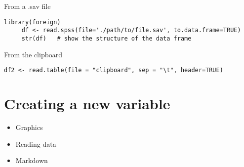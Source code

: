 \documentclass[11pt]{article}
\begin{document}
From a .sav file
\begin{verbatim}
library(foreign)
     df <- read.spss(file='./path/to/file.sav', to.data.frame=TRUE) 
     str(df)   # show the structure of the data frame
\end{verbatim}


From the clipboard
\begin{verbatim}
df2 <- read.table(file = "clipboard", sep = "\t", header=TRUE)
\end{verbatim}

\section{Creating a new variable}
\label{sec:org82d570f}

\begin{itemize}
\item Graphics
\item Reading data
\item Markdown
\end{itemize}
\end{document}
